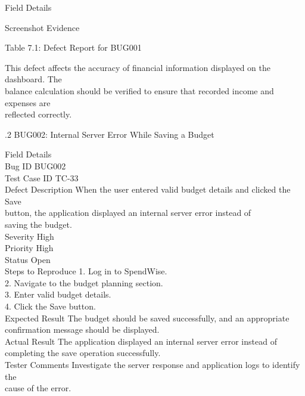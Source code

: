 \documentclass[12pt,a4paper]{report}
\begin{document}
\smallskip
Field                 Details\\ 

\smallskip

\smallskip

\smallskip

\smallskip
Screenshot Evidence\\ 

\smallskip

\smallskip

\smallskip

\smallskip
Table 7.1: Defect Report for BUG001\\ 

\smallskip

\smallskip
This defect affects the accuracy of financial information displayed on the dashboard. The\\ 
balance calculation should be verified to ensure that recorded income and expenses are\\ 
reflected correctly.\\ 

\smallskip

.2 BUG002: Internal Server Error While Saving a Budget\\ 

\smallskip

\smallskip
Field                 Details\\ 
Bug ID                BUG002\\ 
Test Case ID          TC-33\\ 
Defect Description    When the user entered valid budget details and clicked the Save\\ 
button, the application displayed an internal server error instead of\\ 
saving the budget.\\ 
Severity              High\\ 
Priority              High\\ 
Status                Open\\ 
Steps to Reproduce    1. Log in to SpendWise.\\ 
2. Navigate to the budget planning section.\\ 
3. Enter valid budget details.\\ 
4. Click the Save button.\\ 
Expected Result       The budget should be saved successfully, and an appropriate\\ 
confirmation message should be displayed.\\ 
Actual Result         The application displayed an internal server error instead of\\ 
completing the save operation successfully.\\ 
Tester Comments       Investigate the server response and application logs to identify the\\ 
cause of the error.\\ 
\end{document}
